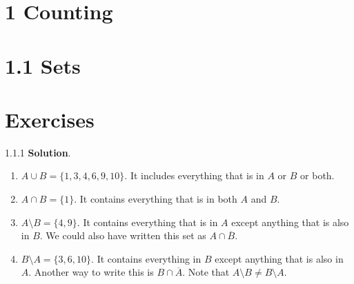\documentclass[11pt,]{book}
\theoremstyle{ptxplainnotitle}
\theoremstyle{ptxplaintitle}
\theoremstyle{ptxdefinitionnotitle}
\theoremstyle{ptxdefinitiontitle}
\theoremstyle{ptxdefinitionnotitle}
\theoremstyle{ptxdefinitiontitle}
\theoremstyle{ptxdefinitionnotitle}
\theoremstyle{ptxdefinitiontitle}
\theoremstyle{ptxdefinitiontitlenonumber}
\theoremstyle{ptxdefinitiontitlenonumber}
\numberwithin{equation}{chapter}
\renewcommand{\bar}{\overline}
\begin{document}
\section*{1 Counting}
\section*{1.1 Sets}
\section*{Exercises}
\begin{divisionexercise}{1.1.1}
\textbf{Solution}.\quad%
\hypertarget{p-822}{}%
\leavevmode%
\begin{enumerate}[label=\alph*.]
\item\hypertarget{li-349}{}\hypertarget{p-823}{}%
\(A \cup B = \{1,3,4,6,9,10\}\text{.}\)  It includes everything that is in \(A\) or \(B\) or both.%
\item\hypertarget{li-350}{}\hypertarget{p-824}{}%
\(A \cap B = \{1\}\text{.}\)  It contains everything that is in both \(A\) and \(B\text{.}\)%
\item\hypertarget{li-351}{}\hypertarget{p-825}{}%
\(A \setminus B = \{4, 9\}\text{.}\)  It contains everything that is in \(A\) except anything that is also in \(B\text{.}\)  We could also have written this set as \(A \cap \bar{B}\text{.}\)%
\item\hypertarget{li-352}{}\hypertarget{p-826}{}%
\(B \setminus A = \{3, 6, 10\}\text{.}\) It contains everything in \(B\) except anything that is also in \(A\text{.}\)  Another way to write this is \(B \cap \bar{A}\text{.}\)  Note that \(A \setminus B \ne B \setminus A\text{.}\)%
\end{enumerate}
%
\end{divisionexercise}%
\end{document}

